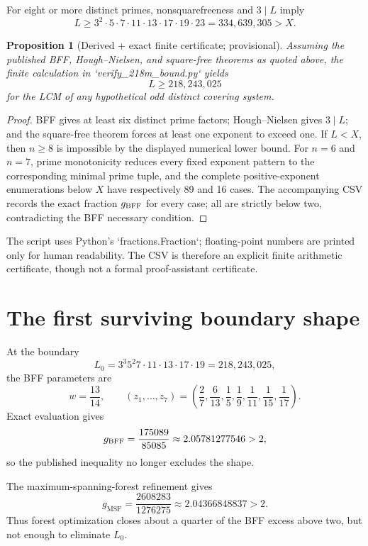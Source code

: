 \documentclass[11pt]{article}
\newtheorem{proposition}[theorem]{Proposition}
\theoremstyle{definition}
\newcommand{\MSF}{\mathrm{MSF}}
\begin{document}
For eight or more distinct primes, nonsquarefreeness and $3\mid L$ imply
\[
 L\ge3^2\cdot5\cdot7\cdot11\cdot13\cdot17\cdot19\cdot23
   =334{,}639{,}305>X.
\]

\begin{proposition}[Derived + exact finite certificate; provisional]
Assuming the published BFF, Hough--Nielsen, and square-free theorems as quoted above, the finite
calculation in `verify\_218m\_bound.py` yields
\[
 \boxed{L\ge218{,}243{,}025}
\]
for the LCM of any hypothetical odd distinct covering system.
\end{proposition}

\begin{proof}
BFF gives at least six distinct prime factors; Hough--Nielsen gives $3\mid L$; and the
square-free theorem forces at least one exponent to exceed one.  If $L<X$, then $n\ge8$ is
impossible by the displayed numerical lower bound.  For $n=6$ and $n=7$, prime monotonicity
reduces every fixed exponent pattern to the corresponding minimal prime tuple, and the complete
positive-exponent enumerations below $X$ have respectively 89 and 16 cases.  The accompanying
CSV records the exact fraction $g_{\rm BFF}$ for every case; all are strictly below two,
contradicting the BFF necessary condition.
\end{proof}

The script uses Python's `fractions.Fraction`; floating-point numbers are printed only for human
readability.  The CSV is therefore an explicit finite arithmetic certificate, though not a
formal proof-assistant certificate.

\section{The first surviving boundary shape}

At the boundary
\begin{equation}\label{eq:L0}
 L_0=3^3 5^2 7\cdot11\cdot13\cdot17\cdot19
     =218{,}243{,}025,
\end{equation}
the BFF parameters are
\[
 w=\frac{13}{14},\qquad
 (z_1,\dots,z_7)=
 \left(\frac27,\frac6{13},\frac15,\frac19,\frac1{11},\frac1{15},\frac1{17}\right).
\]
Exact evaluation gives
\[
 g_{\rm BFF}=\frac{175089}{85085}\approx2.05781277546>2,
\]
so the published inequality no longer excludes the shape.

The maximum-spanning-forest refinement gives
\[
 g_{\MSF}=\frac{2608283}{1276275}\approx2.04366848837>2.
\]
Thus forest optimization closes about a quarter of the BFF excess above two, but not enough to
eliminate $L_0$.
\end{document}
